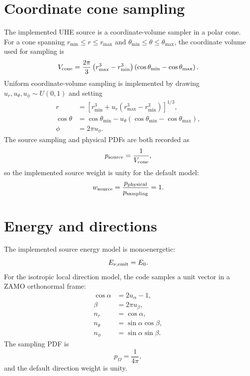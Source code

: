 \documentclass[11pt,a4paper]{report}
\numberwithin{equation}{chapter}
\begin{document}
\section{Coordinate cone sampling}

The implemented UHE source is a coordinate-volume sampler in a polar cone.
For a cone spanning $r_{\min}\leq r\leq r_{\max}$ and
$\theta_{\min}\leq \theta\leq\theta_{\max}$, the coordinate volume used for
sampling is
\begin{equation}
V_{\rm cone}
= \frac{2\pi}{3}
\left(r_{\max}^3-r_{\min}^3\right)
\left(\cos\theta_{\min}-\cos\theta_{\max}\right).
\end{equation}
Uniform coordinate-volume sampling is implemented by drawing
$u_r,u_\theta,u_\phi\sim U(0,1)$ and setting
\begin{align}
r &= \left[
r_{\min}^3 + u_r(r_{\max}^3-r_{\min}^3)
\right]^{1/3},\\
\cos\theta &=
\cos\theta_{\min}
-u_\theta(\cos\theta_{\min}-\cos\theta_{\max}),\\
\phi &= 2\pi u_\phi.
\end{align}
The source sampling and physical PDFs are both recorded as
\begin{equation}
p_{\rm source} = \frac{1}{V_{\rm cone}},
\end{equation}
so the implemented source weight is unity for the default model:
\begin{equation}
w_{\rm source}=
\frac{p_{\rm physical}}{p_{\rm sampling}}=1.
\end{equation}

\section{Energy and directions}

The implemented source energy model is monoenergetic:
\begin{equation}
E_{\nu,\rm emit}=E_0.
\end{equation}
For the isotropic local direction model, the code samples a unit vector in a
ZAMO orthonormal frame:
\begin{align}
\cos\alpha &= 2u_\alpha-1,\\
\beta &= 2\pi u_\beta,\\
n_r &= \cos\alpha,\\
n_\theta &= \sin\alpha\cos\beta,\\
n_\phi &= \sin\alpha\sin\beta.
\end{align}
The sampling PDF is
\begin{equation}
p_\Omega = \frac{1}{4\pi},
\end{equation}
and the default direction weight is unity.
\end{document}
